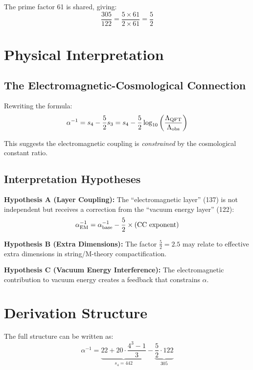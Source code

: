 \documentclass[twocolumn,prl,aps,superscriptaddress]{revtex4-2}
\begin{document}
The prime factor 61 is shared, giving:
\begin{equation}
\frac{305}{122} = \frac{5 \times 61}{2 \times 61} = \frac{5}{2}
\end{equation}

\section{Physical Interpretation}

\subsection{The Electromagnetic-Cosmological Connection}

Rewriting the formula:
\begin{equation}
\alpha^{-1} = s_4 - \frac{5}{2}s_3 = s_4 - \frac{5}{2} \log_{10}\left(\frac{\Lambda_{\rm QFT}}{\Lambda_{\rm obs}}\right)
\end{equation}

This suggests the electromagnetic coupling is \emph{constrained} by the 
cosmological constant ratio.

\subsection{Interpretation Hypotheses}

\textbf{Hypothesis A (Layer Coupling):} The ``electromagnetic layer'' (137) 
is not independent but receives a correction from the ``vacuum energy layer'' (122):
\begin{equation}
\alpha^{-1}_{\rm EM} = \alpha^{-1}_{\rm base} - \frac{5}{2} \times (\text{CC exponent})
\end{equation}

\textbf{Hypothesis B (Extra Dimensions):} The factor $\frac{5}{2} = 2.5$ 
may relate to effective extra dimensions in string/M-theory compactification.

\textbf{Hypothesis C (Vacuum Energy Interference):} The electromagnetic 
contribution to vacuum energy creates a feedback that constrains $\alpha$.

\section{Derivation Structure}

The full structure can be written as:
\begin{equation}
\alpha^{-1} = \underbrace{22 + 20 \cdot \frac{4^3 - 1}{3}}_{s_4 = 442} 
- \underbrace{\frac{5}{2} \cdot 122}_{305}
\end{equation}
\end{document}

